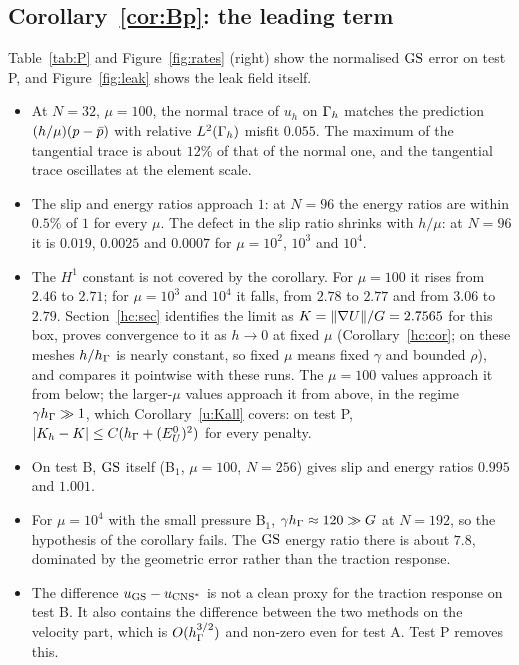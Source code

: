\subsection{Corollary~\ref{cor:Bp}: the leading term}
Table~\ref{tab:P} and Figure~\ref{fig:rates} (right) show the normalised $\mathrm{GS}$ error on test P, and Figure~\ref{fig:leak} shows the leak field itself.
\begin{itemize}
\item At $N=32$, $\mu=100$, the normal trace of $u_h$ on $\Gamma_h$ matches the prediction $(h/\mu)(p-\bar p)$ with relative $L^2(\Gamma_h)$ misfit $0.055$. The maximum of the tangential trace is about $12\%$ of that of the normal one, and the tangential trace oscillates at the element scale.
\item The slip and energy ratios approach $1$: at $N=96$ the energy ratios are within $0.5\%$ of $1$ for every $\mu$. The defect in the slip ratio shrinks with $h/\mu$: at $N=96$ it is $0.019$, $0.0025$ and $0.0007$ for $\mu=10^2$, $10^3$ and $10^4$.
\item The $H^1$ constant is not covered by the corollary. For $\mu=100$ it rises from $2.46$ to $2.71$; for $\mu=10^3$ and $10^4$ it falls, from $2.78$ to $2.77$ and from $3.06$ to $2.79$. Section~\ref{hc:sec} identifies the limit as $K=\lVert \nabla U\rVert/G=2.7565$ for this box, proves convergence to it as $h\to0$ at fixed $\mu$ (Corollary~\ref{hc:cor}; on these meshes $h/h_\Gamma$ is nearly constant, so fixed $\mu$ means fixed $\gamma$ and bounded $\rho$), and compares it pointwise with these runs. The $\mu=100$ values approach it from below; the larger-$\mu$ values approach it from above, in the regime $\gamma h_\Gamma\gg1$, which Corollary~\ref{u:Kall} covers: on test P, $|K_h-K|\le C(h_\Gamma+(E^0_U)^2)$ for every penalty.
\item On test B, $\mathrm{GS}$ itself (B$_1$, $\mu=100$, $N=256$) gives slip and energy ratios $0.995$ and $1.001$.
\item For $\mu=10^4$ with the small pressure B$_1$, $\gamma h_\Gamma\approx120\gg G$ at $N=192$, so the hypothesis of the corollary fails. The $\mathrm{GS}$ energy ratio there is about $7.8$, dominated by the geometric error rather than the traction response.
\item The difference $u_{\mathrm{GS}}-u_{\mathrm{CNS}^\ast}$ is not a clean proxy for the traction response on test B. It also contains the difference between the two methods on the velocity part, which is $O(h_\Gamma^{3/2})$ and non-zero even for test A. Test P removes this.
\end{itemize}

